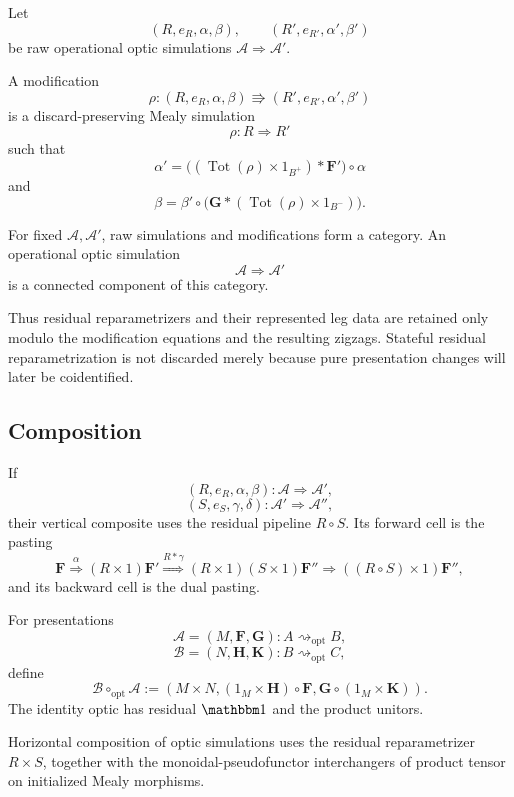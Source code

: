 \begin{definition}
\label{def:optic-modification}
Let
\[
  (R,e_R,\alpha,\beta),
  \qquad
  (R',e_{R'},\alpha',\beta')
\]
be raw operational optic simulations
\(\mathcal A\Longrightarrow\mathcal A'\).

A modification
\[
  \rho:
  (R,e_R,\alpha,\beta)
  \Rrightarrow
  (R',e_{R'},\alpha',\beta')
\]
is a discard-preserving Mealy simulation
\[
  \rho:R\Longrightarrow R'
\]
such that
\[
  \alpha'
  =
  \bigl(
    (\operatorname{Tot}(\rho)\times1_{B^+})\ast\mathbf F'
  \bigr)
  \circ\alpha
\]
and
\[
  \beta
  =
  \beta'
  \circ
  \bigl(
    \mathbf G\ast(\operatorname{Tot}(\rho)\times1_{B^-})
  \bigr).
\]
\end{definition}

For fixed \(\mathcal A,\mathcal A'\), raw simulations and modifications form a category. An
operational optic simulation
\[
  \mathcal A\Longrightarrow\mathcal A'
\]
is a connected component of this category.

Thus residual reparametrizers and their represented leg data are retained only modulo the
modification equations and the resulting zigzags. Stateful residual reparametrization is not
discarded merely because pure presentation changes will later be coidentified.

\subsection{Composition}

If
\[
  (R,e_R,\alpha,\beta):\mathcal A\Longrightarrow\mathcal A',
\]
\[
  (S,e_S,\gamma,\delta):\mathcal A'\Longrightarrow\mathcal A'',
\]
their vertical composite uses the residual pipeline \(R\circ S\). Its forward cell is the pasting
\[
  \mathbf F
  \overset{\alpha}{\Longrightarrow}
  (R\times1)\mathbf F'
  \overset{R\ast\gamma}{\Longrightarrow}
  (R\times1)(S\times1)\mathbf F''
  \Longrightarrow
  ((R\circ S)\times1)\mathbf F'',
\]
and its backward cell is the dual pasting.

For presentations
\[
  \mathcal A=(M,\mathbf F,\mathbf G):A\rightsquigarrow_{\mathrm{opt}}B,
\]
\[
  \mathcal B=(N,\mathbf H,\mathbf K):B\rightsquigarrow_{\mathrm{opt}}C,
\]
define
\[
  \mathcal B\circ_{\mathrm{opt}}\mathcal A
  :=
  \left(
    M\times N,
    (1_M\times\mathbf H)\circ\mathbf F,
    \mathbf G\circ(1_M\times\mathbf K)
  \right).
\]
The identity optic has residual \(\mathbbm1\) and the product unitors.

Horizontal composition of optic simulations uses the residual reparametrizer \(R\times S\), together
with the monoidal-pseudofunctor interchangers of product tensor on initialized Mealy morphisms.

